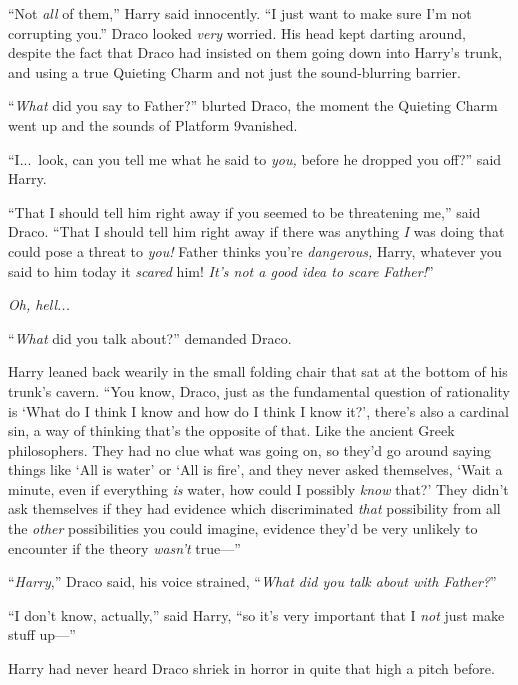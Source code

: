 “Not \emph{all} of them,” Harry said innocently. “I just want to make sure I’m not corrupting you.”
\sbreak
Draco looked \emph{very} worried. His head kept darting around, despite the fact that Draco had insisted on them going down into Harry’s trunk, and using a true Quieting Charm and not just the sound-blurring barrier.

“\emph{What} did you say to Father?” blurted Draco, the moment the Quieting Charm went up and the sounds of Platform 9\tq vanished.

“I...\ look, can you tell me what he said to \emph{you,} before he dropped you off?” said Harry.

“That I should tell him right away if you seemed to be threatening me,” said Draco. “That I should tell him right away if there was anything \emph{I} was doing that could pose a threat to \emph{you!} Father thinks you’re \emph{dangerous,} Harry, whatever you said to him today it \emph{scared} him! \emph{It’s not a good idea to scare Father!}”

\emph{Oh, hell...}

“\emph{What} did you talk about?” demanded Draco.

Harry leaned back wearily in the small folding chair that sat at the bottom of his trunk’s cavern. “You know, Draco, just as the fundamental question of rationality is ‘What do I think I know and how do I think I know it?’, there’s also a cardinal sin, a way of thinking that’s the opposite of that. Like the ancient Greek philosophers. They had no clue what was going on, so they’d go around saying things like ‘All is water’ or ‘All is fire’, and they never asked themselves, ‘Wait a minute, even if everything \emph{is} water, how could I possibly \emph{know} that?’ They didn’t ask themselves if they had evidence which discriminated \emph{that} possibility from all the \emph{other} possibilities you could imagine, evidence they’d be very unlikely to encounter if the theory \emph{wasn’t} true—”

“\emph{Harry},” Draco said, his voice strained, “\emph{What did you talk about with Father?}”

“I don’t know, actually,” said Harry, “so it’s very important that I \emph{not} just make stuff up—”

Harry had never heard Draco shriek in horror in quite that high a pitch before.

